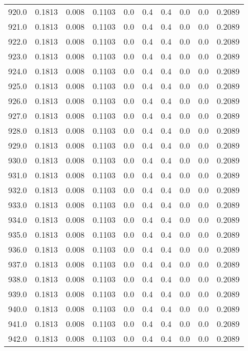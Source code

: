 \begin{longtable}{lrrrrrrrrr}
920.0 & 0.1813 & 0.008 & 0.1103 & 0.0 & 0.4 & 0.4 & 0.0 & 0.0 & 0.2089 \\
921.0 & 0.1813 & 0.008 & 0.1103 & 0.0 & 0.4 & 0.4 & 0.0 & 0.0 & 0.2089 \\
922.0 & 0.1813 & 0.008 & 0.1103 & 0.0 & 0.4 & 0.4 & 0.0 & 0.0 & 0.2089 \\
923.0 & 0.1813 & 0.008 & 0.1103 & 0.0 & 0.4 & 0.4 & 0.0 & 0.0 & 0.2089 \\
924.0 & 0.1813 & 0.008 & 0.1103 & 0.0 & 0.4 & 0.4 & 0.0 & 0.0 & 0.2089 \\
925.0 & 0.1813 & 0.008 & 0.1103 & 0.0 & 0.4 & 0.4 & 0.0 & 0.0 & 0.2089 \\
926.0 & 0.1813 & 0.008 & 0.1103 & 0.0 & 0.4 & 0.4 & 0.0 & 0.0 & 0.2089 \\
927.0 & 0.1813 & 0.008 & 0.1103 & 0.0 & 0.4 & 0.4 & 0.0 & 0.0 & 0.2089 \\
928.0 & 0.1813 & 0.008 & 0.1103 & 0.0 & 0.4 & 0.4 & 0.0 & 0.0 & 0.2089 \\
929.0 & 0.1813 & 0.008 & 0.1103 & 0.0 & 0.4 & 0.4 & 0.0 & 0.0 & 0.2089 \\
930.0 & 0.1813 & 0.008 & 0.1103 & 0.0 & 0.4 & 0.4 & 0.0 & 0.0 & 0.2089 \\
931.0 & 0.1813 & 0.008 & 0.1103 & 0.0 & 0.4 & 0.4 & 0.0 & 0.0 & 0.2089 \\
932.0 & 0.1813 & 0.008 & 0.1103 & 0.0 & 0.4 & 0.4 & 0.0 & 0.0 & 0.2089 \\
933.0 & 0.1813 & 0.008 & 0.1103 & 0.0 & 0.4 & 0.4 & 0.0 & 0.0 & 0.2089 \\
934.0 & 0.1813 & 0.008 & 0.1103 & 0.0 & 0.4 & 0.4 & 0.0 & 0.0 & 0.2089 \\
935.0 & 0.1813 & 0.008 & 0.1103 & 0.0 & 0.4 & 0.4 & 0.0 & 0.0 & 0.2089 \\
936.0 & 0.1813 & 0.008 & 0.1103 & 0.0 & 0.4 & 0.4 & 0.0 & 0.0 & 0.2089 \\
937.0 & 0.1813 & 0.008 & 0.1103 & 0.0 & 0.4 & 0.4 & 0.0 & 0.0 & 0.2089 \\
938.0 & 0.1813 & 0.008 & 0.1103 & 0.0 & 0.4 & 0.4 & 0.0 & 0.0 & 0.2089 \\
939.0 & 0.1813 & 0.008 & 0.1103 & 0.0 & 0.4 & 0.4 & 0.0 & 0.0 & 0.2089 \\
940.0 & 0.1813 & 0.008 & 0.1103 & 0.0 & 0.4 & 0.4 & 0.0 & 0.0 & 0.2089 \\
941.0 & 0.1813 & 0.008 & 0.1103 & 0.0 & 0.4 & 0.4 & 0.0 & 0.0 & 0.2089 \\
942.0 & 0.1813 & 0.008 & 0.1103 & 0.0 & 0.4 & 0.4 & 0.0 & 0.0 & 0.2089 \\

\end{longtable}
